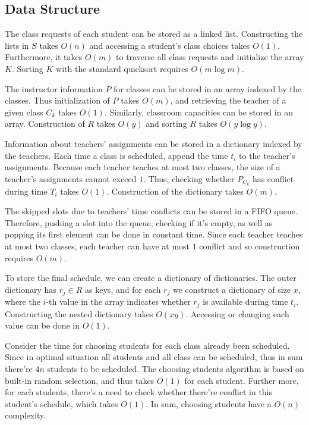 \documentclass[11pt, oneside]{article}   	%
\begin{document}
\subsection{Data Structure}
The class requests of each student can be stored as a linked list. Constructing the lists in $S$ takes $O(n)$ and accessing a student's class choices takes $O(1)$. Furthermore, it takes $O(m)$ to traverse all class requests and initialize the array $K$. Sorting $K$ with the standard quicksort requires $O(m\log m)$.\par
The instructor information $P$ for classes can be stored in an array indexed by the classes. Thus initialization of $P$ takes $O(m)$, and retrieving the teacher of a given class $C_k$ takes $O(1)$. Similarly, classroom capacities can be stored in an array. Construction of $R$ takes $O(y)$ and sorting $R$ takes $O(y\log y)$.\par
Information about teachers' assignments can be stored in a dictionary indexed by the teachers. Each time a class is scheduled, append the time $t_i$ to the teacher's assignments. Because each teacher teaches at most two classes, the size of a teacher's assignments cannot exceed $1$. Thus, checking whether $P_{C_k}$ has conflict during time $T_i$ takes $O(1)$. Construction of the dictionary takes $O(m)$.\par
The skipped slots due to teachers' time conflicts can be stored in a FIFO queue. Therefore, pushing a slot into the queue, checking if it's empty, as well as popping its first element can be done in constant time. Since each teacher teaches at most two classes, each teacher can have at most $1$ conflict and so construction requires $O(m)$.\par
To store the final schedule, we can create a dictionary of dictionaries. The outer dictionary has $r_j\in R$ as keys, and for each $r_j$ we construct a dictionary of size $x$, where the $i$-th value in the array indicates whether $r_j$ is available during time $t_i$. Constructing the nested dictionary takes $O(xy)$. Accessing or changing each value can be done in $O(1)$.\par
Consider the time for choosing students for each class already been scheduled. Since in optimal situation all students and all class can be scheduled, thus in sum there're $4n$ students to be scheduled. The choosing students algorithm is based on built-in random selection, and thus takes $O(1)$ for each student. Further more, for each students, there's a need to check whether there're conflict in this student's schedule, which takes $O(1)$. In sum, choosing students have a $O(n)$ complexity.
\end{document}
